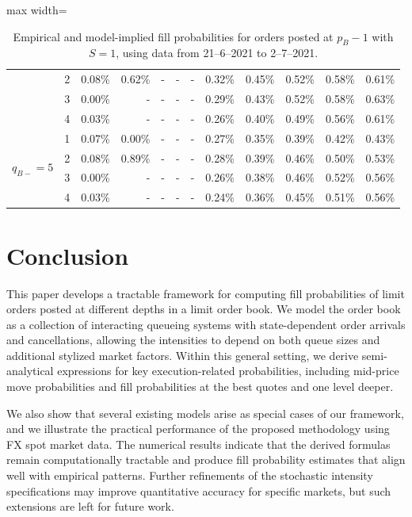 \documentclass[11pt]{article}
\begin{document}
\begin{table}[!htbp]
\begin{adjustbox}{max width=\textwidth}
\begin{tabular}{c c r r r r r |r r r r r}
             & 2 & 0.08\% & 0.62\% & -     & -     & - & 0.32\% & 0.45\% & 0.52\% & 0.58\% & 0.61\% \\
             & 3 & 0.00\% & -     & -     & -     & - & 0.29\% & 0.43\% & 0.52\% & 0.58\% & 0.63\% \\
             & 4 & 0.03\% & -     & -     & -     & - & 0.26\% & 0.40\% & 0.49\% & 0.56\% & 0.61\% \\\midrule
             \multirow{4}{*}{$q_{B-}=5$} & 1 & 0.07\% & 0.00\% & -     & -     & - & 0.27\% & 0.35\% & 0.39\% & 0.42\% & 0.43\% \\
             & 2 & 0.08\% & 0.89\% & -     & -     & - & 0.28\% & 0.39\% & 0.46\% & 0.50\% & 0.53\%  \\
             & 3 & 0.00\% & -     & -     & -     & - & 0.26\% & 0.38\% & 0.46\% & 0.52\% & 0.56\% \\
             & 4 & 0.03\% & -     & -     & -     & - & 0.24\% & 0.36\% & 0.45\% & 0.51\% & 0.56\% \\\bottomrule
            \end{tabular}
        \end{adjustbox}
        \caption{Empirical and model-implied fill probabilities for orders posted at $p_B-1$ with $S=1$, using data from 21--6--2021 to 2--7--2021.}

     \label{tab: prob_level2_result}
\end{table}


\section{Conclusion}\label{conclusion}

This paper develops a tractable framework for computing fill probabilities of limit orders posted at different depths in a limit order book. We model the order book as a collection of interacting queueing systems with state-dependent order arrivals and cancellations, allowing the intensities to depend on both queue sizes and additional stylized market factors. Within this general setting, we derive semi-analytical expressions for key execution-related probabilities, including mid-price move probabilities and fill probabilities at the best quotes and one level deeper. 

We also show that several existing models arise as special cases of our framework, and we illustrate the practical performance of the proposed methodology using FX spot market data. The numerical results indicate that the derived formulas remain computationally tractable and produce fill probability estimates that align well with empirical patterns. Further refinements of the stochastic intensity specifications may improve quantitative accuracy for specific markets, but such extensions are left for future work.
\\
\end{document}
